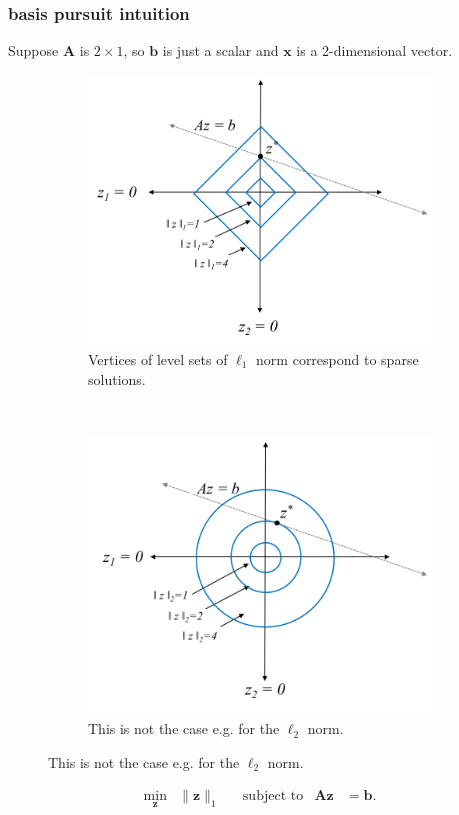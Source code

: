 \documentclass[compress]{beamer}
\newcommand{\bv}[1]{\mathbf{#1}}
\begin{document}
	\begin{frame}[t]
		\frametitle{basis pursuit intuition}
		Suppose $\bv{A}$ is $2\times 1$, so $\bv{b}$ is just a scalar and $\bv{x}$ is a 2-dimensional vector.
		\begin{figure}[h]
			\centering
			\begin{subfigure}[t]{0.48\textwidth}
				\centering
				\includegraphics[width=\textwidth]{l1opt.png}
				\caption{Vertices of level sets of $\ell_1$ norm correspond to sparse solutions.}
			\end{subfigure}
			~
			\begin{subfigure}[t]{0.48\textwidth}
				\centering
				\includegraphics[width=\textwidth]{l2opt.png}
				\caption{This is not the case e.g. for the $\ell_2$ norm.}
			\end{subfigure}
		\end{figure}
		\vspace{-.5em}
		\begin{align*}
			\min_{\bv{z}} &\|\bv{z}\|_1 & &\text{subject to} & \bv{Az} &= \bv{b} .
		\end{align*}
	\end{frame}
	
\end{document}
